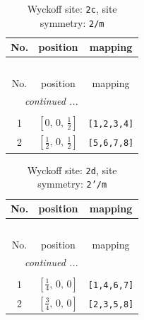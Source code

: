 \documentclass[fleqn,8pt]{jsarticle}
\begin{document}
\begin{longtable}{ccc}
\caption{Wyckoff site: {\tt 2c}, site symmetry: {\tt 2/m}}
 \\
 \hline \hline
No. & position & mapping \\ \hline \endfirsthead

\multicolumn{2}{l}{\tablename\ \thetable{}} \\
 \hline \hline
No. & position & mapping \\ \hline \endhead

 \hline \hline
\multicolumn{2}{r}{\footnotesize\it continued ...} \\ \endfoot

 \hline \hline
\multicolumn{2}{r}{} \\ \endlastfoot

1 & $\left[ 0,\, 0,\, \frac{1}{2} \right]$ & {\tt [1,2,3,4]} \\ \hline
2 & $\left[ \frac{1}{2},\, 0,\, \frac{1}{2} \right]$ & {\tt [5,6,7,8]} \\
\end{longtable}
\renewcommand{\arraystretch}{1.2}
\begin{longtable}{ccc}
\caption{Wyckoff site: {\tt 2d}, site symmetry: {\tt 2'/m}}
 \\
 \hline \hline
No. & position & mapping \\ \hline \endfirsthead

\multicolumn{2}{l}{\tablename\ \thetable{}} \\
 \hline \hline
No. & position & mapping \\ \hline \endhead

 \hline \hline
\multicolumn{2}{r}{\footnotesize\it continued ...} \\ \endfoot

 \hline \hline
\multicolumn{2}{r}{} \\ \endlastfoot

1 & $\left[ \frac{1}{4},\, 0,\, 0 \right]$ & {\tt [1,4,6,7]} \\ \hline
2 & $\left[ \frac{3}{4},\, 0,\, 0 \right]$ & {\tt [2,3,5,8]} \\
\end{longtable}
\renewcommand{\arraystretch}{1.2}
\end{document}
